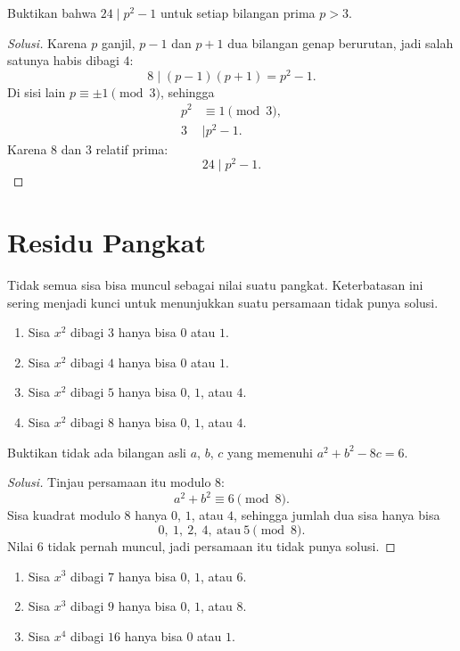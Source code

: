 \documentclass[12pt]{scrartcl}
\begin{document}
\begin{example}
Buktikan bahwa $24 \mid p^2 - 1$ untuk setiap bilangan prima $p > 3$.
\end{example}
\begin{proof}[Solusi]
Karena $p$ ganjil, $p - 1$ dan $p + 1$ dua bilangan genap berurutan,
jadi salah satunya habis dibagi $4$:
\[ 8 \mid (p-1)(p+1) = p^2 - 1. \]
Di sisi lain $p \equiv \pm 1 \pmod{3}$, sehingga
\begin{align*}
p^2 &\equiv 1 \pmod{3}, \\
3 &\mid p^2 - 1.
\end{align*}
Karena $8$ dan $3$ relatif prima:
\[ 24 \mid p^2 - 1. \]
\end{proof}

\section{Residu Pangkat}

Tidak semua sisa bisa muncul sebagai nilai suatu pangkat.
Keterbatasan ini sering menjadi kunci untuk menunjukkan suatu persamaan tidak punya solusi.

\begin{fact}
\begin{enumerate}
    \item Sisa $x^2$ dibagi $3$ hanya bisa $0$ atau $1$.
    \item Sisa $x^2$ dibagi $4$ hanya bisa $0$ atau $1$.
    \item Sisa $x^2$ dibagi $5$ hanya bisa $0$, $1$, atau $4$.
    \item Sisa $x^2$ dibagi $8$ hanya bisa $0$, $1$, atau $4$.
\end{enumerate}
\end{fact}

\begin{example}
Buktikan tidak ada bilangan asli $a$, $b$, $c$ yang memenuhi $a^2 + b^2 - 8c = 6$.
\end{example}
\begin{proof}[Solusi]
Tinjau persamaan itu modulo $8$:
\[ a^2 + b^2 \equiv 6 \pmod{8}. \]
Sisa kuadrat modulo $8$ hanya $0$, $1$, atau $4$,
sehingga jumlah dua sisa hanya bisa
\[ 0,\ 1,\ 2,\ 4,\ \text{atau}\ 5 \pmod{8}. \]
Nilai $6$ tidak pernah muncul, jadi persamaan itu tidak punya solusi.
\end{proof}

\begin{fact}
\begin{enumerate}
    \item Sisa $x^3$ dibagi $7$ hanya bisa $0$, $1$, atau $6$.
    \item Sisa $x^3$ dibagi $9$ hanya bisa $0$, $1$, atau $8$.
    \item Sisa $x^4$ dibagi $16$ hanya bisa $0$ atau $1$.
\end{enumerate}
\end{fact}
\end{document}
